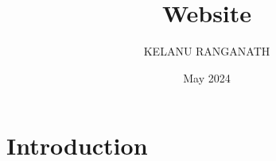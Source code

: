 \documentclass{article}
\title{Website}
\author{KELANU RANGANATH}
\date{May 2024}
\begin{document}
\maketitle

\section{Introduction}
\end{document}
